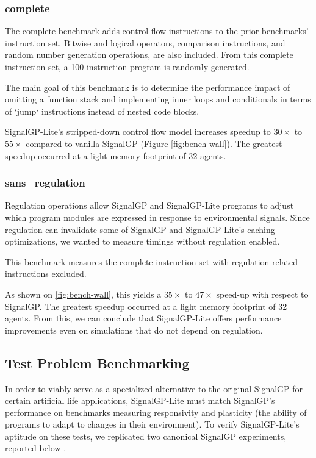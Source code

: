 \subsubsection{complete}

The complete benchmark adds control flow instructions to the prior benchmarks' instruction set.
Bitwise and logical operators, comparison instructions, and random number generation operations, are also included.
From this complete instruction set, a 100-instruction program is randomly generated.

The main goal of this benchmark is to determine the performance impact of omitting a function stack and implementing inner loops and conditionals in terms of `jump` instructions instead of nested code blocks.

SignalGP-Lite's stripped-down control flow model increases speedup to $30\times$ to $55\times$ compared to vanilla SignalGP (Figure \ref{fig:bench-wall}).
The greatest speedup occurred at a light memory footprint of 32 agents.

\subsubsection{sans\_regulation}

Regulation operations allow SignalGP and SignalGP-Lite programs to adjust which program modules are expressed in response to environmental signals.
Since regulation can invalidate some of SignalGP and SignalGP-Lite's caching optimizations, we wanted to measure timings without regulation enabled.

This benchmark measures the complete instruction set with regulation-related instructions excluded.

As shown on \autoref{fig:bench-wall}, this yields a $35\times$ to $47\times$ speed-up with respect to SignalGP.
The greatest speedup occurred at a light memory footprint of 32 agents.
From this, we can conclude that SignalGP-Lite offers performance improvements even on simulations that do not depend on regulation.

\subsection{Test Problem Benchmarking}

In order to viably serve as a specialized alternative to the original SignalGP for certain artificial life applications, SignalGP-Lite must match SignalGP's performance on benchmarks measuring responsivity and plasticity (the ability of programs to adapt to changes in their environment).
To verify SignalGP-Lite's aptitude on these tests, we replicated two canonical SignalGP experiments, reported below \citep{lalejini2018evolving,lalejini_tag-based_2021}.

